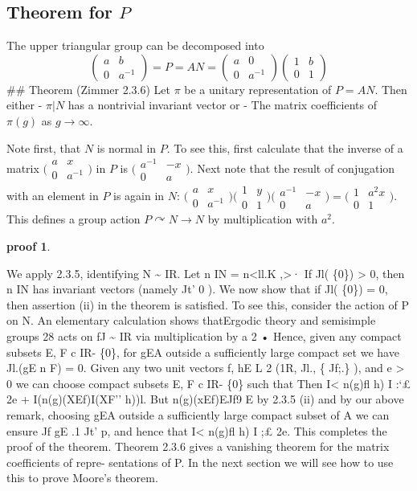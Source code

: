 \documentclass[
]{article}
\newtheorem{pf}{proof}
\newcommand{\ipmatrix}[1]{%
  \big(\begin{smallmatrix} #1 \end{smallmatrix}\big)}
\begin{document}
\hypertarget{theorem-for-p}{%
\subsection{Theorem for \texorpdfstring{$P$}{P}}\label{theorem-for-p}}

The upper triangular group can be decomposed into
\[\begin{pmatrix}a & b \\ 0 & a^{-1}\end{pmatrix} =
P = AN =
\begin{pmatrix}a & 0 \\ 0 & a^{-1}\end{pmatrix} \begin{pmatrix}1 & b \\ 0 & 1\end{pmatrix}\]
\#\# Theorem (Zimmer 2.3.6) Let \(\pi\) be a unitary representation of
\(P = AN\). Then either - \(\pi|N\) has a nontrivial invariant vector or
- The matrix coefficients of \(\pi(g)\) as \(g \rightarrow \infty\).

Note first, that $N$ is normal in $P$. To see this, first calculate that the
inverse of a matrix $\ipmatrix{ a & x \\ 0 & a^{-1} }$ in $P$ is
$\ipmatrix{ a^{-1} & -x \\ 0 & a }$.
Next note that the result of conjugation with an element in $P$ is again in $N$:
$\ipmatrix{ a & x \\ 0 & a^{-1} } \ipmatrix{1 & y \\ 0 & 1} \ipmatrix{ a^{-1} & -x \\ 0 & a } = \ipmatrix{1 & a^2x \\ 0 & 1}$.
This defines a group action $P \curvearrowright N \rightarrow N$ by multiplication with $a^2$.

\begin{pf}
  
\end{pf}


 We apply 2.3.5, identifying N \textasciitilde{}
IR. Let n IN = n\textless ll.K ,\textgreater· If Jl( \{0\})
\textgreater{} 0, then n IN has invariant vectors (namely Jt' 0 ). We
now show that if Jl( \{0\}) = 0, then assertion (ii) in the theorem is
satisfied. To see this, consider the action of P on N. An elementary
calculation shows thatErgodic theory and semisimple groups 28 acts on fJ
\textasciitilde{} IR via multiplication by a 2 • Hence, given any
compact subsets E, F c IR- \{0\}, for gEA outside a sufficiently large
compact set we have Jl.(gE n F) = 0. Given any two unit vectors f, hE L
2 (1R, Jl., \{ Jf;.\} ), and e \textgreater{} 0 we can choose compact
subsets E, F c IR- \{0\} such that Then I\textless{} n(g)fl h) I :`£ 2e
+ I(n(g)(XEf)I(XF'' h))l. But n(g)(xEf)EJf9 E by 2.3.5 (ii) and by our
above remark, choosing gEA outside a sufficiently large compact subset
of A we can ensure Jf gE .1 Jt' p, and hence that I\textless{} n(g)fl h)
I ;£ 2e. This completes the proof of the theorem. Theorem 2.3.6 gives a
vanishing theorem for the matrix coefficients of repre- sentations of P.
In the next section we will see how to use this to prove Moore's
theorem.
\end{document}
